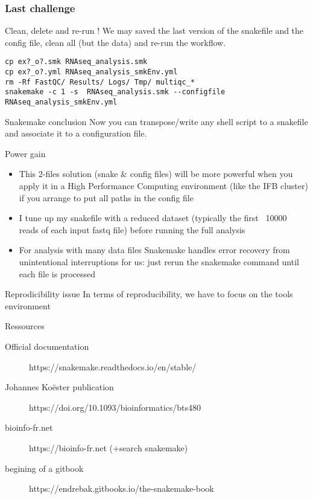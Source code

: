 \begin{frame}[containsverbatim]
\frametitle{Last challenge}
\begin{exampleblock}{Clean, delete and re-run !}
We may saved the last version of the snakefile and the config file, clean all (but the data) and re-run the workflow.
\begin{lstlisting}
cp ex?_o?.smk RNAseq_analysis.smk
cp ex?_o?.yml RNAseq_analysis_smkEnv.yml
rm -Rf FastQC/ Results/ Logs/ Tmp/ multiqc_*
snakemake -c 1 -s  RNAseq_analysis.smk --configfile RNAseq_analysis_smkEnv.yml
\end{lstlisting}
\end{exampleblock}
\end{frame}
\begin{frame}{Snakemake conclusion}
Now you can transpose/write any shell script to a snakefile and associate it to a configuration file.
\begin{block}{Power gain}
\begin{itemize}
    \item This 2-files solution (snake $\&$ config files) will be more powerful when you apply it in a High Performance Computing environment (like the IFB cluster) if you arrange to put all paths in the config file
    \item I tune up my snakefile with a reduced dataset (typically the first ~10000 reads of each input fastq file) before running the full analysis
    \item For analysis with many data files Snakemake handles error recovery from unintentional interruptions for us: just rerun the snakemake command until each file is processed
\end{itemize}
\end{block}
\begin{block}{Reprodicibility issue}
In terms of reproducibility, we have to focus on the tools environment
\end{block}
\end{frame}
\begin{frame}{Ressources}
\begin{description}
    \item [Official documentation] https://snakemake.readthedocs.io/en/stable/
    \item [Johannes Koëster publication] https://doi.org/10.1093/bioinformatics/bts480
    \item [bioinfo-fr.net]  https://bioinfo-fr.net (+search snakemake)
    \item [begining of a gitbook] https://endrebak.gitbooks.io/the-snakemake-book
\end{description}
    
\end{frame}
